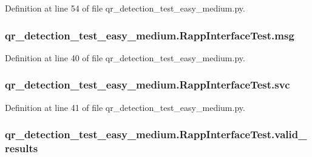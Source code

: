 Definition at line 54 of file qr\-\_\-detection\-\_\-test\-\_\-easy\-\_\-medium.\-py.

\hypertarget{classqr__detection__test__easy__medium_1_1RappInterfaceTest_a04c7e2a44edded440537627c6c49ca52}{
\subsubsection[{msg}]{\setlength{\rightskip}{0pt plus 5cm}qr\-\_\-detection\-\_\-test\-\_\-easy\-\_\-medium.\-Rapp\-Interface\-Test.\-msg}}\label{classqr__detection__test__easy__medium_1_1RappInterfaceTest_a04c7e2a44edded440537627c6c49ca52}


Definition at line 40 of file qr\-\_\-detection\-\_\-test\-\_\-easy\-\_\-medium.\-py.

\hypertarget{classqr__detection__test__easy__medium_1_1RappInterfaceTest_ade5e67316cf22234d40e1cab43e65a76}{
\subsubsection[{svc}]{\setlength{\rightskip}{0pt plus 5cm}qr\-\_\-detection\-\_\-test\-\_\-easy\-\_\-medium.\-Rapp\-Interface\-Test.\-svc}}\label{classqr__detection__test__easy__medium_1_1RappInterfaceTest_ade5e67316cf22234d40e1cab43e65a76}


Definition at line 41 of file qr\-\_\-detection\-\_\-test\-\_\-easy\-\_\-medium.\-py.

\hypertarget{classqr__detection__test__easy__medium_1_1RappInterfaceTest_a713cf42e02e18a8ffedc6be5bd82affb}{
\subsubsection[{valid\-\_\-results}]{\setlength{\rightskip}{0pt plus 5cm}qr\-\_\-detection\-\_\-test\-\_\-easy\-\_\-medium.\-Rapp\-Interface\-Test.\-valid\-\_\-results}}\label{classqr__detection__test__easy__medium_1_1RappInterfaceTest_a713cf42e02e18a8ffedc6be5bd82affb}


